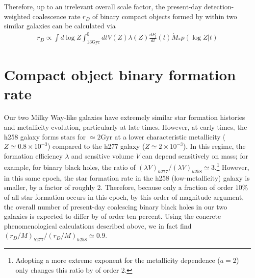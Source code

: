 \documentclass[a4paper,fleqn,usenatbib]{mnras}
\newcommand\editremark[1]{{\color{red}#1}}
\newcommand\unit[1]{\text{#1}}
\newcommand\ExcitingGalaxy{h258}
\newcommand\BoringGalaxy{h277}
\begin{document}
Therefore, up to an irrelevant overall scale factor, the  present-day detection-weighted coalescence rate $r_D$  of binary compact objects formed by within two similar
galaxies  can be calculated via
\begin{eqnarray}\label{eqn:rate}
 r_D \propto  \int d\log Z  \int _{13 \unit{Gyr}}^0dt  V(Z) \lambda(Z) \frac{dP_t}{dt}(t) \dot{M}_* p(\log Z|t)
\end{eqnarray}


\section{Compact object binary formation rate}
\label{sec:results:BBH}


 Our two Milky Way-like galaxies have extremely similar star formation histories and metallicity evolution, particularly at late
 times.  
However, at early times, the \ExcitingGalaxy{} galaxy forms stars for $\simeq 2\unit{Gyr}$ at a lower characteristic metallicity
($Z\simeq 0.8 \times10^{-3}$) compared
to the \BoringGalaxy{} galaxy ($Z\simeq 2\times 10^{-3}$).  In this regime, the formation efficiency $\lambda$ and sensitive volume $V$
can depend sensitively on mass; for example, for binary black holes, the ratio of  $(\lambda V)_{\BoringGalaxy{}}/(\lambda
V)_{\ExcitingGalaxy{}} \simeq 3$.\footnote{Adopting a more extreme exponent for the metallicity dependence ($a=2$) only
  changes this ratio by of order $2$.}   However, in this same epoch, the star formation rate in the \ExcitingGalaxy{} (low-metallicity)
galaxy is smaller, by a factor of roughly 2.
Therefore, because only a fraction of order $10\%$  of all star formation occurs in this epoch, by this order of magnitude
argument, the overall number of
present-day coalescing binary black holes in our two galaxies is expected to differ by of order ten percent.
%
Using the concrete phenomenological calculations described above, we in fact find
$(r_{D}/M)_{\BoringGalaxy{}}/(r_{D}/M)_{\ExcitingGalaxy{}}\simeq 0.9$.    
\end{document}
